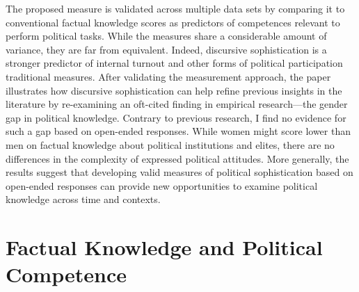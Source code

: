 \documentclass[12pt]{article}
\begin{document}
The proposed measure is validated across multiple data sets by comparing it to conventional factual knowledge scores as predictors of competences relevant to perform political tasks. While the measures share a considerable amount of variance, they are far from equivalent. Indeed, discursive sophistication is a stronger predictor of internal turnout and other forms of political participation traditional measures. After validating the measurement approach, the paper illustrates how discursive sophistication can help refine previous insights in the literature by re-examining an oft-cited finding in empirical research---the gender gap in political knowledge. Contrary to previous research, I find no evidence for such a gap based on open-ended responses. While women might score lower than men on factual knowledge about political institutions and elites, there are no differences in the complexity of expressed political attitudes. More generally, the results suggest that developing valid measures of political sophistication based on open-ended responses can provide new opportunities to examine political knowledge across time and contexts. 


\section*{Factual Knowledge and Political Competence}

\end{document}
